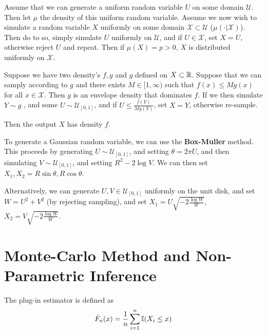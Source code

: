 \begin{defn}
  \label{sec:monte-carlo-4}
  Assume that we can generate a uniform random variable $U$ on some
  domain $\mathcal{U}$.  Then let $\mu$ the density of this uniform
  random variable.  Assume we now wish to simulate a random variable
  $X$ uniformly on some domain $\mathcal{X} \subset \mathcal{U}$ ($\mu
  (\cdot | \mathcal{X})$).  Then do to so, simply simulate $U$
  uniformly on $\mathcal{U}$, and if $U \in \mathcal{X}$, set $X = U$,
  otherwise reject $U$ and repeat.  Then if $\mu(X) = p > 0$, $X$ is
  distributed uniformly on $\mathcal{X}$.
\end{defn}

\begin{thm}
  \label{sec:monte-carlo-5}
  Suppose we have two density's $f, g$ and $g$ defined on $X \subset
  \mathbb{R}$. Suppose that we can samply according to $g$ and there exists $M
  \in [1, \infty)$ such that $f(x) \leq M g(x)$ for all $x \in
  \mathcal{X}$. Then $g$ is an envelope density that dominates $f$. If
  we then simulate $Y \sim g$ , and some $U \sim \mathcal{U}_{[0,
    1]}$, and if $U \leq \frac{f(Y)}{Mg(Y)}$, set $X = Y$, otherwise
  re-sample.

  Then the output $X$ has density $f$.
\end{thm}

\begin{thm}
  \label{sec:monte-carlo-6}
  To generate a Gaussian random variable, we can use the
  \textbf{Box-Muller} method.  This proceeds by generating $U \sim
  \mathcal{U}_{[0, 1]}$, and setting $\theta = 2 \pi U$, and then
  simulating $V \sim \mathcal{U}_{[0, 1]}$, and setting $R^{2} - 2
  \log V$.  We can then set $X_{1}, X_{2} = R \sin \theta, R \cos
  \theta$.

  Alternatively, we can generate $U, V \in \mathcal{U}_{[0, 1]}$
  uniformly on the unit disk, and set $W = U^{2} + V^{2}$ (by
  rejecting sampling), and set $X_{1} = U \sqrt{-2 \frac{\log W}{W}
  }$, $X_{2} = V \sqrt{-2 \frac{\log W}{W}}$.
\end{thm}

\section{Monte-Carlo Method and Non-Parametric Inference}
\label{sec:monte-carlo-method}

\begin{defn}
  \label{sec:monte-carlo-method-1}
  The plug-in estimator is defined as
  \begin{equation}
    \hat F_{n}(x) = \frac{1}{n} \sum_{i=1}^{n} \I{X_{i} \leq x}
  \end{equation}
\end{defn}

